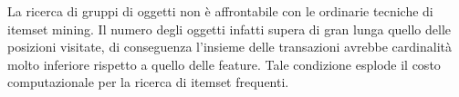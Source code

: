 La ricerca di gruppi di oggetti non è affrontabile con le ordinarie tecniche di itemset mining.
Il numero degli oggetti infatti supera di gran lunga quello delle posizioni visitate, di conseguenza 
l'insieme delle transazioni avrebbe cardinalità molto inferiore rispetto a quello delle feature.
Tale condizione esplode il costo computazionale per la ricerca di itemset frequenti.